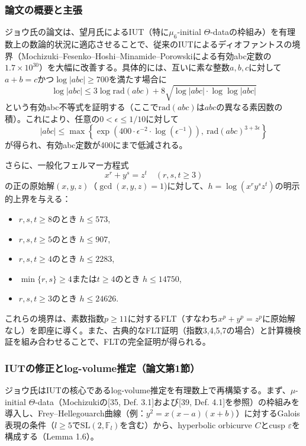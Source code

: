 \documentclass[a4paper,12pt,notitlepage]{jsreport}
\begin{document}
\subsubsection{論文の概要と主張}
ジョウ氏の論文は、望月氏によるIUT（特に\(\mu_6\)-initial \(\Theta\)-dataの枠組み）を有理数上の数論的状況に適応させることで、従来のIUTによるディオファントスの境界（Mochizuki–Fesenko–Hoshi–Minamide–Porowskiによる有効abc定数の\(1.7 \times 10^{30}\)）を大幅に改善する。具体的には、互いに素な整数\(a,b,c\)に対して\(a+b=c\)かつ\(\log|abc| \geq 700\)を満たす場合に
\[
\log|abc| \leq 3\log\mathrm{rad}(abc) + 8\sqrt{\log|abc| \cdot \log\log|abc|}
\]
という有効abc不等式を証明する（ここで\(\mathrm{rad}(abc)\)は\(abc\)の異なる素因数の積）。これにより、任意の\(0 < \epsilon \leq 1/10\)に対して
\[
|abc| \leq \max\left\{ \exp(400 \cdot \epsilon^{-2} \cdot \log(\epsilon^{-1})), \ \mathrm{rad}(abc)^{3+3\epsilon} \right\}
\]
が得られ、有効abc定数が400にまで低減される。

さらに、一般化フェルマー方程式
\[
x^r + y^s = z^t \quad (r,s,t \geq 3)
\]
の正の原始解\((x,y,z)\)（\(\gcd(x,y,z)=1\))に対して、\(h = \log(x^r y^s z^t)\)の明示的上界を与える：
\begin{itemize}
\item \(r,s,t \geq 8\)のとき \(h \leq 573\),
\item \(r,s,t \geq 5\)のとき \(h \leq 907\),
\item \(r,s,t \geq 4\)のとき \(h \leq 2283\),
\item \(\min\{r,s\} \geq 4\)または\(t \geq 4\)のとき \(h \leq 14750\),
\item \(r,s,t \geq 3\)のとき \(h \leq 24626\).
\end{itemize}
これらの境界は、素数指数\(p \geq 11\)に対するFLT（すなわち\(x^p + y^p = z^p\)に原始解なし）を即座に導く。また、古典的なFLT証明（指数3,4,5,7の場合）と計算機検証を組み合わせることで、FLTの完全証明が得られる。

\subsubsection{IUTの修正とlog-volume推定（論文第1節）}
ジョウ氏はIUTの核心であるlog-volume推定を有理数上で再構築する。まず、\(\mu\)-initial \(\Theta\)-data（Mochizukiの[35, Def. 3.1]および[39, Def. 4.1]を参照）の枠組みを導入し、Frey–Hellegouarch曲線（例：\(y^2 = x(x-a)(x+b)\)）に対するGalois表現の条件（\(l \geq 5\)で\(\mathrm{SL}(2,\mathbb{F}_l)\)を含む）から、hyperbolic orbicurve \(C\)とcusp \(\varepsilon\)を構成する（Lemma 1.6）。
\end{document}
